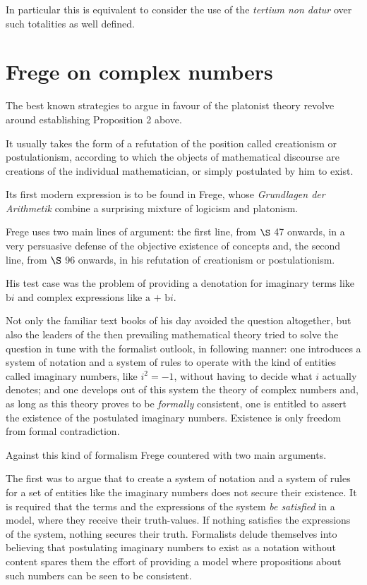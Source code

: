 \documentclass[12pt]{article}
\begin{document}
In particular this is equivalent to consider the use of the \emph{tertium non datur} over such totalities as well defined.

\section{Frege on complex numbers}\normalsize

The best known strategies to argue in favour of the platonist theory revolve around establishing Proposition 2 above.

It usually takes the form of a refutation of the position called creationism or postulationism, according to which the objects of mathematical discourse are creations of the individual mathematician, or simply postulated by him to exist.

Its first modern expression is to be found in Frege, whose \emph{Grundlagen der Arithmetik} combine a surprising mixture of logicism and platonism. 

Frege uses two main lines of argument: the first line, from $\S$ 47 onwards, in a very persuasive defense of the objective existence of concepts and, the second line, from $\S$ 96 onwards, in his refutation of creationism or postulationism.

His test case was the problem of providing a denotation for imaginary terms like $\text{b}i$ and complex expressions like $\text{a + b}i$.

Not only the familiar text books of his day avoided the question altogether, but also the leaders of the then prevailing mathematical theory tried to solve the question in tune with the formalist outlook, in following manner: one introduces a system of notation and a system of rules to operate with the kind of entities called imaginary numbers, like $i^2 = -1$, without having to decide what $i$ actually denotes; and one develops out of this system the theory of complex numbers and, as  long as this theory proves to be \emph{formally} consistent, one is entitled to assert the existence of the postulated imaginary numbers. Existence is only freedom from formal contradiction.

Against this kind of formalism Frege countered with two main arguments.

The first was to argue that to create a system of notation and a system of rules for a set of entities like the imaginary numbers does not secure their existence. It is required that the terms and the expressions of the system \emph{be satisfied} in a model, where they receive their truth-values. If nothing satisfies the expressions of the system, nothing secures their truth. Formalists delude themselves into believing that postulating imaginary numbers to exist as a notation without content spares them the effort of providing a model where propositions about such numbers can be seen to be consistent.
\end{document}
